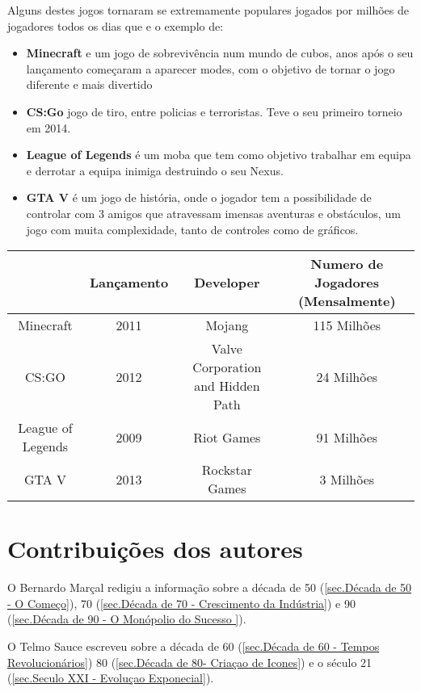 \documentclass{report}
\begin{document}
Alguns destes jogos tornaram se extremamente populares jogados por milhões de jogadores todos os dias que e o exemplo de:

 \begin{itemize}
    \item \textbf{Minecraft} e um jogo de sobrevivência num mundo de cubos, anos após o seu lançamento começaram a aparecer modes, com o objetivo de tornar o jogo diferente e mais divertido 
    \item \textbf{CS:Go} jogo de tiro, entre policias e terroristas. Teve o seu primeiro torneio em 2014.
    \item \textbf{League of Legends} é um \ac{moba} que tem como objetivo trabalhar em equipa e derrotar a equipa inimiga destruindo o seu Nexus. 
    \item \textbf{GTA V} é um jogo de história, onde o jogador tem a possibilidade de controlar com 3 amigos que atravessam imensas aventuras e obstáculos, um jogo com muita complexidade, tanto de controles como de gráficos.
 \end{itemize}
    
\begin{center}
\begin{tabular}{ |c|c|c|c| } 
\hline
           & Lançamento & Developer & Numero de Jogadores (Mensalmente) \\
\hline
Minecraft & 2011 & Mojang & 115 Milhões \\
\hline
CS:GO & 2012 & Valve Corporation and Hidden Path & 24 Milhões \\
\hline 
League of Legends & 2009  & Riot Games & 91 Milhões\\
\hline
GTA V & 2013 & Rockstar Games & 3 Milhões\\
\hline
\end{tabular}
\end{center}


\chapter*{Contribuições dos autores}
O Bernardo Marçal redigiu a informação sobre a década de 50 (\autoref{sec.Década de 50 - O Começo}), 70 (\autoref{sec.Década de 70 - Crescimento da Indústria}) e 90 (\autoref{sec.Década de 90 - O Monópolio do Sucesso }).
 
O Telmo Sauce escreveu sobre a década de 60 (\autoref{sec.Década de 60 - Tempos Revolucionários}) 80 (\autoref{sec.Década de 80- Criaçao de Icones}) e o século 21 (\autoref{sec.Seculo XXI - Evoluçao Exponecial}).
 
\end{document}
